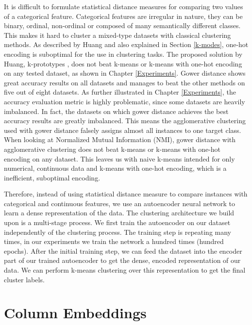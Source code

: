 It is difficult to formulate statistical distance measures for comparing two values of a categorical feature. Categorical features are irregular in nature, they can be binary, ordinal, non-ordinal or composed of many semantically different classes. This makes it hard to cluster a mixed-type datasets with classical clustering methods. As described by Huang \cite{kmodes} and also explained in Section \ref{k-modes}, one-hot encoding is suboptimal for the use in clustering tasks. The proposed solution by Huang, k-prototypes \cite{kmodes}, does not beat k-means or k-means with one-hot encoding on any tested dataset, as shown in Chapter \ref{Experiments}. Gower distance shows great accuracy results on all datasets and manages to beat the other methods on five out of eight datasets. As further illustrated in Chapter \ref{Experiments}, the accuracy evaluation metric is highly problematic, since some datasets are heavily imbalanced. In fact, the datasets on which gower distance achieves the best accuracy results are greatly imbalanced. This means the agglomerative clustering used with gower distance falsely assigns almost all instances to one target class. When looking at Normalized Mutual Information (NMI), gower distance with agglomerative clustering does not beat k-means or k-means with one-hot encoding on any dataset. This leaves us with naive k-means intended for only numerical, continuous data and k-means with one-hot encoding, which is a inefficient, suboptimal encoding.

Therefore, instead of using statistical distance measure to compare instances with categorical and continuous features, we use an autoencoder neural network to learn a dense representation of the data. The clustering architecture we build upon is a multi-stage process. We first train the autoencoder on our dataset independently of the clustering process. The training step is repeating many times, in our experiments we train the network a hundred times (hundred epochs). After the initial training step, we can feed the dataset into the encoder part of our trained autoencoder to get the dense, encoded representation of our data. We can perform k-means clustering over this representation to get the final cluster labels.

\section{Column Embeddings} \label{Column Embeddings}

